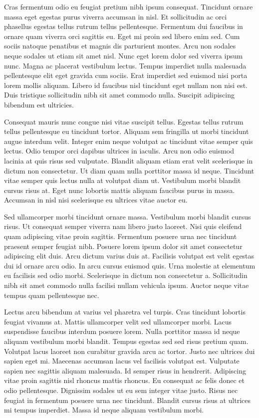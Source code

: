 \documentclass[11pt,a4paper]{article}
\begin{document}
Cras fermentum odio eu feugiat pretium nibh ipsum consequat. Tincidunt ornare massa eget egestas purus viverra accumsan in nisl. Et sollicitudin ac orci phasellus egestas tellus rutrum tellus pellentesque. Fermentum dui faucibus in ornare quam viverra orci sagittis eu. Eget mi proin sed libero enim sed. Cum sociis natoque penatibus et magnis dis parturient montes. Arcu non sodales neque sodales ut etiam sit amet nisl. Nunc eget lorem dolor sed viverra ipsum nunc. Magna ac placerat vestibulum lectus. Tempus imperdiet nulla malesuada pellentesque elit eget gravida cum sociis. Erat imperdiet sed euismod nisi porta lorem mollis aliquam. Libero id faucibus nisl tincidunt eget nullam non nisi est. Duis tristique sollicitudin nibh sit amet commodo nulla. Suscipit adipiscing bibendum est ultricies.

Consequat mauris nunc congue nisi vitae suscipit tellus. Egestas tellus rutrum tellus pellentesque eu tincidunt tortor. Aliquam sem fringilla ut morbi tincidunt augue interdum velit. Integer enim neque volutpat ac tincidunt vitae semper quis lectus. Odio tempor orci dapibus ultrices in iaculis. Arcu non odio euismod lacinia at quis risus sed vulputate. Blandit aliquam etiam erat velit scelerisque in dictum non consectetur. Ut diam quam nulla porttitor massa id neque. Tincidunt vitae semper quis lectus nulla at volutpat diam ut. Vestibulum morbi blandit cursus risus at. Eget nunc lobortis mattis aliquam faucibus purus in massa. Accumsan in nisl nisi scelerisque eu ultrices vitae auctor eu.

Sed ullamcorper morbi tincidunt ornare massa. Vestibulum morbi blandit cursus risus. Ut consequat semper viverra nam libero justo laoreet. Nisi quis eleifend quam adipiscing vitae proin sagittis. Fermentum posuere urna nec tincidunt praesent semper feugiat nibh. Posuere lorem ipsum dolor sit amet consectetur adipiscing elit duis. Arcu dictum varius duis at. Facilisis volutpat est velit egestas dui id ornare arcu odio. In arcu cursus euismod quis. Urna molestie at elementum eu facilisis sed odio morbi. Scelerisque in dictum non consectetur a. Sollicitudin nibh sit amet commodo nulla facilisi nullam vehicula ipsum. Auctor neque vitae tempus quam pellentesque nec.

Lectus arcu bibendum at varius vel pharetra vel turpis. Cras tincidunt lobortis feugiat vivamus at. Mattis ullamcorper velit sed ullamcorper morbi. Lacus suspendisse faucibus interdum posuere lorem. Nulla porttitor massa id neque aliquam vestibulum morbi blandit. Tempus egestas sed sed risus pretium quam. Volutpat lacus laoreet non curabitur gravida arcu ac tortor. Justo nec ultrices dui sapien eget mi. Maecenas accumsan lacus vel facilisis volutpat est. Vulputate sapien nec sagittis aliquam malesuada. Id semper risus in hendrerit. Adipiscing vitae proin sagittis nisl rhoncus mattis rhoncus. Eu consequat ac felis donec et odio pellentesque. Dignissim sodales ut eu sem integer vitae justo. Risus nec feugiat in fermentum posuere urna nec tincidunt. Blandit cursus risus at ultrices mi tempus imperdiet. Massa id neque aliquam vestibulum morbi.
\end{document}
